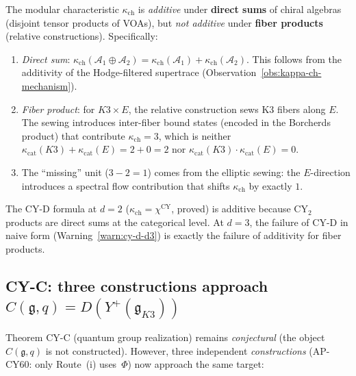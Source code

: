 \documentclass[11pt]{article}
\newcommand{\cA}{\mathcal{A}}
\newcommand{\fg}{\mathfrak{g}}
\newcommand{\CY}{\mathrm{CY}}
\begin{document}
\begin{observation}
\label{obs:cy-d-root-cause}
The modular characteristic $\kappa_{\mathrm{ch}}$ is \emph{additive}
under \textbf{direct sums} of chiral algebras (disjoint tensor
products of VOAs), but \emph{not additive} under \textbf{fiber
products} (relative constructions). Specifically:
\begin{enumerate}[label=\textup{(\roman*)}]
 \item \emph{Direct sum}: $\kappa_{\mathrm{ch}}(\cA_1 \oplus \cA_2) =
 \kappa_{\mathrm{ch}}(\cA_1) + \kappa_{\mathrm{ch}}(\cA_2)$. This
 follows from the additivity of the Hodge-filtered supertrace
 (Observation~\ref{obs:kappa-ch-mechanism}).
 \item \emph{Fiber product}: for $K3 \times E$, the relative
 construction sews K3 fibers along $E$. The sewing introduces
 inter-fiber bound states (encoded in the Borcherds product) that
 contribute $\kappa_{\mathrm{ch}} = 3$, which is neither
 $\kappa_{\mathrm{cat}}(K3) + \kappa_{\mathrm{cat}}(E) = 2 + 0 = 2$
 nor $\kappa_{\mathrm{cat}}(K3) \cdot \kappa_{\mathrm{cat}}(E) = 0$.
 \item The ``missing'' unit ($3 - 2 = 1$) comes from the elliptic
 sewing: the $E$-direction introduces a spectral flow contribution
 that shifts $\kappa_{\mathrm{ch}}$ by exactly $1$.
\end{enumerate}
The CY-D formula at $d = 2$ ($\kappa_{\mathrm{ch}} = \chi^{\CY}$,
proved) is additive because CY$_2$ products are direct sums at the
categorical level. At $d = 3$, the failure of CY-D in naive form
(Warning~\ref{warn:cy-d-d3}) is exactly the failure of additivity
for fiber products.
\end{observation}


\subsection{CY-C: three constructions approach $C(\fg, q) = D(Y^+(\fg_{K3}))$}
\label{subsec:cy-c-three-routes}

Theorem CY-C (quantum group realization) remains \emph{conjectural}
(the object $C(\fg, q)$ is not constructed). However, three
independent \emph{constructions} (AP-CY60: only Route~(i) uses~$\Phi$)
now approach the same target:
\end{document}

